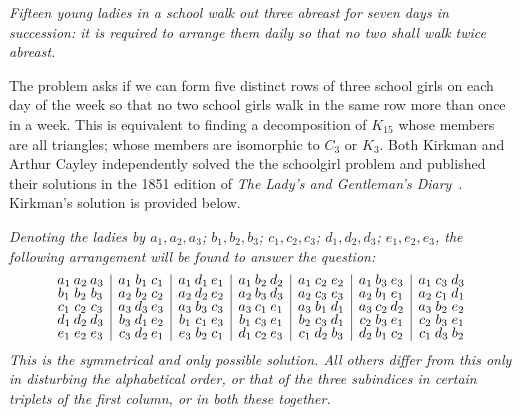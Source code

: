 \begin{center}
\begin{minipage}{0.7\textwidth}
  \centering\itshape
  Fifteen young ladies in a school walk out three abreast for seven days in succession: it is required to arrange them daily so that no two shall walk twice abreast.
\end{minipage}
\end{center}

The problem asks if we can form five distinct rows of three school girls on each day of the week so that no two school girls walk in the same row more than once in a week. This is equivalent to finding a decomposition of $K_{15}$ whose members are all triangles; whose members are isomorphic to $C_{3}$ or $K_{3}$. Both Kirkman and Arthur Cayley independently solved the the schoolgirl problem and published their solutions in the 1851 edition of \textit{The Lady's and Gentleman's Diary}~\cite{Kirkman1851}. Kirkman's solution is provided below.

  \vspace{1em}
  \itshape
  \noindent Denoting the ladies by $a_1, a_2, a_3$; $b_1, b_2, b_3$; $c_1, c_2, c_3$; $d_1, d_2, d_3$; $e_1, e_2, e_3$, the following arrangement will be found to answer the question:
\[
\renewcommand{\arraystretch}{0.7}
\begin{array}{
  @{}c@{\hskip 2pt}c@{\hskip 2pt}c
  |c@{\hskip 2pt}c@{\hskip 2pt}c
  |c@{\hskip 2pt}c@{\hskip 2pt}c
  |c@{\hskip 2pt}c@{\hskip 2pt}c
  |c@{\hskip 2pt}c@{\hskip 2pt}c
  |c@{\hskip 2pt}c@{\hskip 2pt}c
  |c@{\hskip 2pt}c@{\hskip 2pt}c@{}}
a_1 & a_2 & a_3 & a_1 & b_1 & c_1 & a_1 & d_1 & e_1 & a_1 & b_2 & d_2 & a_1 & c_2 & e_2 & a_1 & b_3 & e_3 & a_1 & c_3 & d_3 \\
b_1 & b_2 & b_3 & a_2 & b_2 & c_2 & a_2 & d_2 & e_2 & a_2 & b_3 & d_3 & a_2 & c_3 & e_3 & a_2 & b_1 & e_1 & a_2 & c_1 & d_1 \\
c_1 & c_2 & c_3 & a_3 & d_3 & e_3 & a_3 & b_3 & c_3 & a_3 & c_1 & e_1 & a_3 & b_1 & d_1 & a_3 & c_2 & d_2 & a_3 & b_2 & e_2 \\
d_1 & d_2 & d_3 & b_3 & d_1 & e_2 & b_1 & c_1 & e_3 & b_1 & c_3 & e_1 & b_2 & c_3 & d_1 & c_2 & b_3 & e_1 & c_2 & b_3 & e_1 \\
e_1 & e_2 & e_3 & c_3 & d_2 & e_1 & e_3 & b_2 & c_1 & d_1 & c_2 & e_3 & c_1 & d_2 & b_3 & d_2 & b_1 & c_2 & c_1 & d_3 & b_2 \\
\end{array}
\]
\noindent This is the symmetrical and only possible solution. All others differ from this only in disturbing the alphabetical order, or that of the three subindices in certain triplets of the first column, or in both these together.\newline

